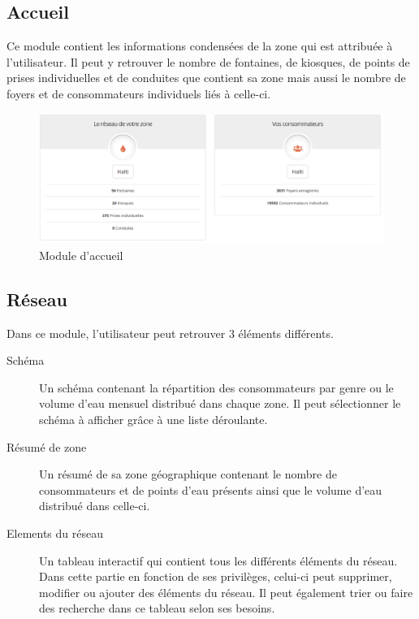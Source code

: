 \documentclass{EPL-master-thesis-covers-FR}
\begin{document}
			\subsection{Accueil}
				Ce module contient les informations condensées de la zone qui est attribuée à l'utilisateur. Il peut y retrouver le nombre de fontaines, de kiosques, de points de prises individuelles et de conduites que contient sa zone mais aussi le nombre de foyers et de consommateurs individuels liés à celle-ci. 
								
				\begin{figure}[H]
					\centering
					\includegraphics[width=1\textwidth]{images/dashboard}
					\caption{Module d'accueil}
				\end{figure}
				
				
			\subsection{Réseau}
				\label{sec:reseau}
				Dans ce module, l'utilisateur peut retrouver 3 éléments différents.
				
				\begin{description}
				\item[Schéma] Un schéma contenant la répartition des consommateurs par genre ou le volume d'eau mensuel distribué dans chaque zone. Il peut sélectionner le schéma à afficher grâce à une liste déroulante.
				\item[Résumé de zone] Un résumé de sa zone géographique contenant le nombre de consommateurs et de points d'eau présents ainsi que le volume d'eau distribué dans celle-ci.
				\item[Elements du réseau] Un tableau interactif qui contient tous les différents éléments du réseau. Dans cette partie en fonction de ses privilèges, celui-ci peut supprimer, modifier ou ajouter des éléments du réseau. Il peut également trier ou faire des recherche dans ce tableau selon ses besoins.
				\end{description}
				
\end{document}
